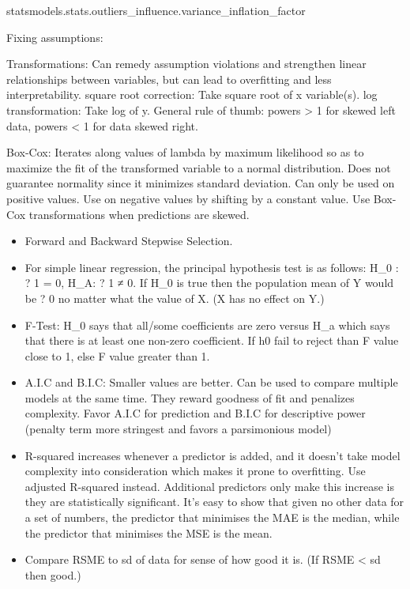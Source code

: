 \documentclass[]{book}
\newenvironment{Shaded}{\begin{snugshade}}{\end{snugshade}}
\newcommand{\NormalTok}[1]{#1}
\begin{document}
\begin{Shaded}
\begin{Highlighting}[]
\NormalTok{statsmodels.stats.outliers_influence.variance_inflation_factor}
\end{Highlighting}
\end{Shaded}

Fixing assumptions:

Transformations: Can remedy assumption violations and strengthen linear
relationships between variables, but can lead to overfitting and less
interpretability. square root correction: Take square root of x
variable(s). log transformation: Take log of y. General rule of thumb:
powers \textgreater{} 1 for skewed left data, powers \textless{} 1 for
data skewed right.

Box-Cox: Iterates along values of lambda by maximum likelihood so as to
maximize the fit of the transformed variable to a normal distribution.
Does not guarantee normality since it minimizes standard deviation. Can
only be used on positive values. Use on negative values by shifting by a
constant value. Use Box-Cox transformations when predictions are skewed.

\begin{itemize}
\item
  Forward and Backward Stepwise Selection.
\item
  For simple linear regression, the principal hypothesis test is as
  follows: H\_0 : ? 1 = 0, H\_A: ? 1 ≠ 0. If H\_0 is true then the
  population mean of Y would be ? 0 no matter what the value of X. (X
  has no effect on Y.)
\item
  F-Test: H\_0 says that all/some coefficients are zero versus H\_a
  which says that there is at least one non-zero coefficient. If h0 fail
  to reject than F value close to 1, else F value greater than 1.
\item
  A.I.C and B.I.C: Smaller values are better. Can be used to compare
  multiple models at the same time. They reward goodness of fit and
  penalizes complexity. Favor A.I.C for prediction and B.I.C for
  descriptive power (penalty term more stringest and favors a
  parsimonious model)
\item
  R-squared increases whenever a predictor is added, and it doesn't take
  model complexity into consideration which makes it prone to
  overfitting. Use adjusted R-squared instead. Additional predictors
  only make this increase is they are statistically significant. It's
  easy to show that given no other data for a set of numbers, the
  predictor that minimises the MAE is the median, while the predictor
  that minimises the MSE is the mean.
\item
  Compare RSME to sd of data for sense of how good it is. (If RSME
  \textless{} sd then good.)
\end{itemize}
\end{document}
